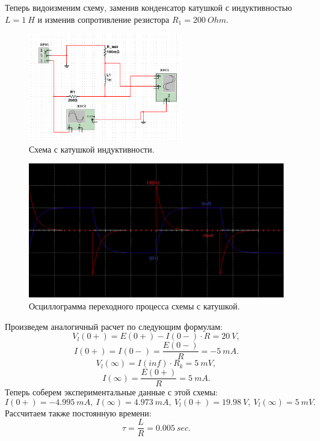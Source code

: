 \documentclass[12pt]{article}
\begin{document}
Теперь видоизменим схему, заменив конденсатор катушкой с индуктивностью $L = 1 \ H$ и изменив сопротивление резистора $R_1 = 200 \ Ohm.$
\begin{figure}[H]
    \centering
    \includegraphics[width=0.6\textwidth]{scheme_2.png}
    \caption{Схема с катушкой индуктивности.}
    \label{fig:scheme_2}
\end{figure}

\begin{figure}[H]
    \centering
    \includegraphics[width=\textwidth]{tran_2.png}
    \caption{Осциллограмма переходного процесса схемы с катушкой.}
    \label{fig:tran_2}
\end{figure}

Произведем аналогичный расчет по следующим формулам:
\[
    V_l(0+) = E(0+) - I(0-) \cdot R = 20 \ V,
\]
\[
    I(0+) = I(0-) = \frac{E(0-)}{R} = -5 \ mA.
\]
\[
    V_l(\infty) = I(inf) \cdot R_k = 5 \ mV,
\]
\[
    I(\infty) = \frac{E(0+)}{R} = 5 \ mA.
\]
Теперь соберем экспериментальные данные с этой схемы:
\[
    I(0+) = -4.995 \ mA, \ I(\infty) = 4.973 \ mA, \ V_l(0+) = 19.98 \ V, \ V_l(\infty) = 5 \ mV.
\]
Рассчитаем также постоянную времени:
\[
    \tau = \frac{L}{R} = 0.005 \ sec.
\]
\end{document}
